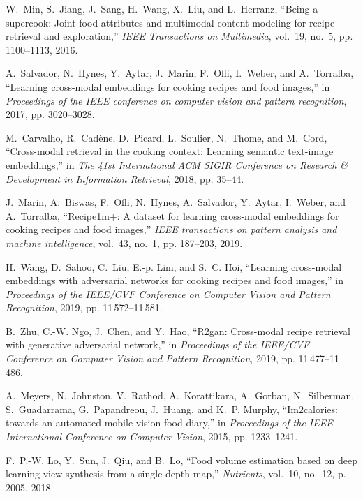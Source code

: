 \documentclass[journal]{IEEEtran}
\begin{document}
\begin{thebibliography}{10}
W.~Min, S.~Jiang, J.~Sang, H.~Wang, X.~Liu, and L.~Herranz, ``Being a
  supercook: Joint food attributes and multimodal content modeling for recipe
  retrieval and exploration,'' \emph{IEEE Transactions on Multimedia}, vol.~19,
  no.~5, pp. 1100--1113, 2016.

A.~Salvador, N.~Hynes, Y.~Aytar, J.~Marin, F.~Ofli, I.~Weber, and A.~Torralba,
  ``Learning cross-modal embeddings for cooking recipes and food images,'' in
  \emph{Proceedings of the IEEE conference on computer vision and pattern
  recognition}, 2017, pp. 3020--3028.

M.~Carvalho, R.~Cad{\`e}ne, D.~Picard, L.~Soulier, N.~Thome, and M.~Cord,
  ``Cross-modal retrieval in the cooking context: Learning semantic text-image
  embeddings,'' in \emph{The 41st International ACM SIGIR Conference on
  Research \& Development in Information Retrieval}, 2018, pp. 35--44.

J.~Marin, A.~Biswas, F.~Ofli, N.~Hynes, A.~Salvador, Y.~Aytar, I.~Weber, and
  A.~Torralba, ``Recipe1m+: A dataset for learning cross-modal embeddings for
  cooking recipes and food images,'' \emph{IEEE transactions on pattern
  analysis and machine intelligence}, vol.~43, no.~1, pp. 187--203, 2019.

H.~Wang, D.~Sahoo, C.~Liu, E.-p. Lim, and S.~C. Hoi, ``Learning cross-modal
  embeddings with adversarial networks for cooking recipes and food images,''
  in \emph{Proceedings of the IEEE/CVF Conference on Computer Vision and
  Pattern Recognition}, 2019, pp. 11\,572--11\,581.

B.~Zhu, C.-W. Ngo, J.~Chen, and Y.~Hao, ``R2gan: Cross-modal recipe retrieval
  with generative adversarial network,'' in \emph{Proceedings of the IEEE/CVF
  Conference on Computer Vision and Pattern Recognition}, 2019, pp.
  11\,477--11\,486.

A.~Meyers, N.~Johnston, V.~Rathod, A.~Korattikara, A.~Gorban, N.~Silberman,
  S.~Guadarrama, G.~Papandreou, J.~Huang, and K.~P. Murphy, ``Im2calories:
  towards an automated mobile vision food diary,'' in \emph{Proceedings of the
  IEEE International Conference on Computer Vision}, 2015, pp. 1233--1241.

F.~P.-W. Lo, Y.~Sun, J.~Qiu, and B.~Lo, ``Food volume estimation based on deep
  learning view synthesis from a single depth map,'' \emph{Nutrients}, vol.~10,
  no.~12, p. 2005, 2018.


\end{thebibliography}
\end{document}
